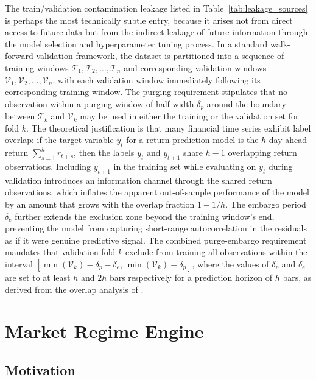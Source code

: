 \documentclass[12pt,openany]{book}
\numberwithin{equation}{chapter}
\theoremstyle{plain}
\theoremstyle{definition}
\theoremstyle{remark}
\begin{document}
The train/validation contamination leakage listed in Table~\ref{tab:leakage_sources} is perhaps the most technically subtle entry, because it arises not from direct access to future data but from the indirect leakage of future information through the model selection and hyperparameter tuning process. In a standard walk-forward validation framework, the dataset is partitioned into a sequence of training windows $\mathcal{T}_1, \mathcal{T}_2, \ldots, \mathcal{T}_n$ and corresponding validation windows $\mathcal{V}_1, \mathcal{V}_2, \ldots, \mathcal{V}_n$, with each validation window immediately following its corresponding training window. The purging requirement stipulates that no observation within a purging window of half-width $\delta_p$ around the boundary between $\mathcal{T}_k$ and $\mathcal{V}_k$ may be used in either the training or the validation set for fold $k$. The theoretical justification is that many financial time series exhibit label overlap: if the target variable $y_t$ for a return prediction model is the $h$-day ahead return $\sum_{s=1}^{h} r_{t+s}$, then the labels $y_t$ and $y_{t+1}$ share $h-1$ overlapping return observations. Including $y_{t+1}$ in the training set while evaluating on $y_t$ during validation introduces an information channel through the shared return observations, which inflates the apparent out-of-sample performance of the model by an amount that grows with the overlap fraction $1 - 1/h$. The embargo period $\delta_e$ further extends the exclusion zone beyond the training window's end, preventing the model from capturing short-range autocorrelation in the residuals as if it were genuine predictive signal. The combined purge-embargo requirement mandates that validation fold $k$ exclude from training all observations within the interval $[\min(\mathcal{V}_k) - \delta_p - \delta_e,\, \min(\mathcal{V}_k) + \delta_p]$, where the values of $\delta_p$ and $\delta_e$ are set to at least $h$ and $2h$ bars respectively for a prediction horizon of $h$ bars, as derived from the overlap analysis of \citet{deMLforAF2018}.



\chapter{Market Regime Engine}

\section{Motivation}
\end{document}
